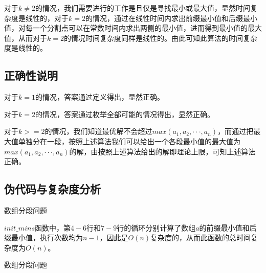 \documentclass{article}
\begin{document}
对于$k\ne2$的情况，我们需要进行的工作是且仅是寻找最小或最大值，显然时间复杂度是线性的，对于$k=2$的情况，通过在线性时间内求出前缀最小值和后缀最小值，对每一个分割点可以在常数时间内求出两侧的最小值，进而得到最小值的最大值，从而对于$k=2$的情况时间复杂度同样是线性的。由此可知此算法的时间复杂度是线性的。

\subsection{正确性说明}

对于$k=1$的情况，答案通过定义得出，显然正确。

对于$k=2$的情况，答案通过枚举全部可能的情况得出，显然正确。

对于$k>=2$的情况，我们知道最优解不会超过$max(a_1,a_2,···,a_n)$，而通过把最大值单独分在一段，按照上述算法我们可以给出一个各段最小值的最大值为$max(a_1,a_2,···,a_n)$的解，由按照上述算法给出的解即理论上限，可知上述算法正确。

\subsection{伪代码与复杂度分析}

\begin{algorithm}[H]

\caption{数组分段问题}
\LinesNumbered
{}


\end{algorithm}

$init\_mins$函数中，第$4-6$行和$7-9$行的循环分别计算了数组$a$的前缀最小值和后缀最小值，执行次数均为$n-1$，因此是$O(n)$复杂度的，从而此函数的总时间复杂度为$O(n)$。

\begin{algorithm}[H]

\caption{数组分段问题}
\LinesNumbered
{}


\end{algorithm}
\end{document}
